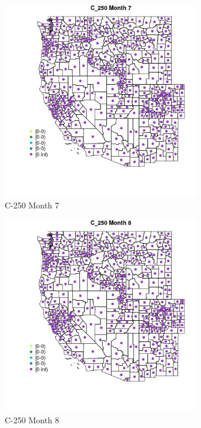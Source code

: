 \begin{figure} 
\centering  
\includegraphics[width=0.77\textwidth]{Code_Outputs/df_report_ML_predictors_CountyCentroid_Locations_Dates_2008-01-01to2018-12-31_MapObsMo7C_250.jpg} 
\caption{\label{fig:df_report_ML_predictors_CountyCentroid_Locations_Dates_2008-01-01to2018-12-31MapObsMo7C_250}C-250 Month 7} 
\end{figure} 
 

\begin{figure} 
\centering  
\includegraphics[width=0.77\textwidth]{Code_Outputs/df_report_ML_predictors_CountyCentroid_Locations_Dates_2008-01-01to2018-12-31_MapObsMo8C_250.jpg} 
\caption{\label{fig:df_report_ML_predictors_CountyCentroid_Locations_Dates_2008-01-01to2018-12-31MapObsMo8C_250}C-250 Month 8} 
\end{figure} 
 

